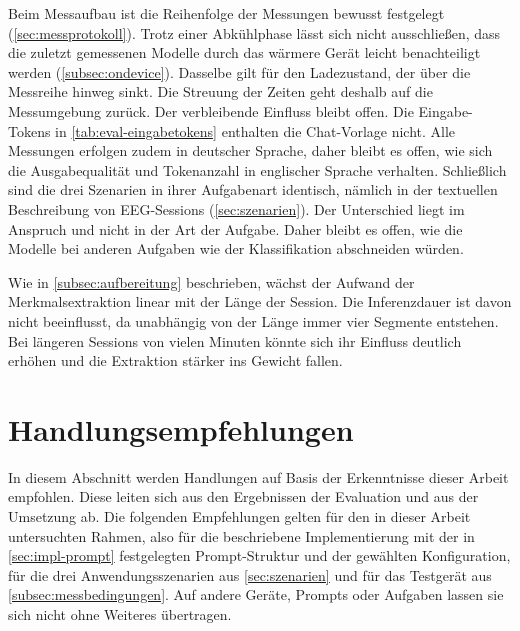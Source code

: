 \noindent Beim Messaufbau ist die Reihenfolge der Messungen bewusst festgelegt (\autoref{sec:messprotokoll}). Trotz einer Abkühlphase lässt sich nicht ausschließen, dass die zuletzt gemessenen Modelle durch das wärmere Gerät leicht benachteiligt werden (\autoref{subsec:ondevice}). Dasselbe gilt für den Ladezustand, der über die Messreihe hinweg sinkt. Die Streuung der Zeiten geht deshalb auf die Messumgebung zurück. Der verbleibende Einfluss bleibt offen. Die Eingabe-Tokens in \autoref{tab:eval-eingabetokens} enthalten die Chat-Vorlage nicht. Alle Messungen erfolgen zudem in deutscher Sprache, daher bleibt es offen, wie sich die Ausgabequalität und Tokenanzahl in englischer Sprache verhalten. Schließlich sind die drei Szenarien in ihrer Aufgabenart identisch, nämlich in der textuellen Beschreibung von \ac{EEG}-Sessions (\autoref{sec:szenarien}). Der Unterschied liegt im Anspruch und nicht in der Art der Aufgabe. Daher bleibt es offen, wie die Modelle bei anderen Aufgaben wie der Klassifikation abschneiden würden.
\vspace{\baselineskip}

\noindent Wie in \autoref{subsec:aufbereitung} beschrieben, wächst der Aufwand der Merkmalsextraktion linear mit der Länge der Session. Die Inferenzdauer ist davon nicht beeinflusst, da unabhängig von der Länge immer vier Segmente entstehen. Bei längeren Sessions von vielen Minuten könnte sich ihr Einfluss deutlich erhöhen und die Extraktion stärker ins Gewicht fallen.

\section{Handlungsempfehlungen}
\label{sec:empfehlungen}
In diesem Abschnitt werden Handlungen auf Basis der Erkenntnisse dieser Arbeit empfohlen. Diese leiten sich aus den Ergebnissen der Evaluation und aus der Umsetzung ab. Die folgenden Empfehlungen gelten für den in dieser Arbeit untersuchten Rahmen, also für die beschriebene Implementierung mit der in \autoref{sec:impl-prompt} festgelegten Prompt-Struktur und der gewählten Konfiguration, für die drei Anwendungsszenarien aus \autoref{sec:szenarien} und für das Testgerät aus \autoref{subsec:messbedingungen}. Auf andere Geräte, Prompts oder Aufgaben lassen sie sich nicht ohne Weiteres übertragen.

